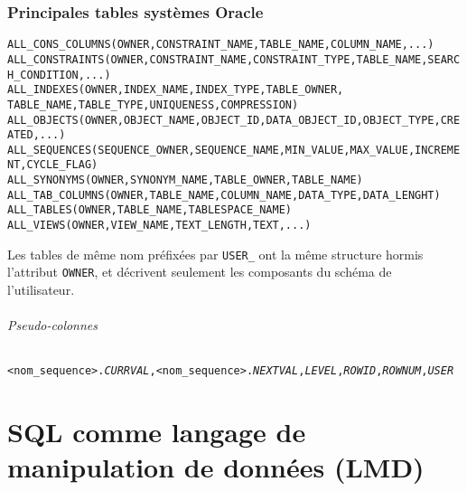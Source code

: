 \documentclass[10pt]{article}
\begin{document}
	\section{Principales tables systèmes Oracle}
		\begin{alltt}
			\begin{tabbing}
				ALL_CONS_COLUMNS \= (OWNER, CONSTRAINT_NAME, TABLE_NAME, COLUMN_NAME,...)\\
				ALL_CONSTRAINTS \> (OWNER, CONSTRAINT_NAME, CONSTRAINT_TYPE, TABLE_NAME, SEARCH_CONDITION,...)\\
				ALL_INDEXES \> (OWNER, INDEX_NAME, INDEX_TYPE, TABLE_OWNER, \\
							\> TABLE_NAME, TABLE_TYPE, UNIQUENESS, COMPRESSION)\\
				ALL_OBJECTS \> (OWNER, OBJECT_NAME, OBJECT_ID, DATA_OBJECT_ID, OBJECT_TYPE, CREATED, ...)\\
				ALL_SEQUENCES \> (SEQUENCE_OWNER, SEQUENCE_NAME, MIN_VALUE, MAX_VALUE, INCREMENT, CYCLE_FLAG)\\
				ALL_SYNONYMS \> (OWNER, SYNONYM_NAME, TABLE_OWNER, TABLE_NAME)\\
				ALL_TAB_COLUMNS \> (OWNER, TABLE_NAME, COLUMN_NAME, DATA_TYPE, DATA_LENGHT)\\
				ALL_TABLES \> (OWNER, TABLE_NAME, TABLESPACE_NAME)\\
				ALL_VIEWS \> (OWNER, VIEW_NAME, TEXT_LENGTH, TEXT,...)
			\end{tabbing}
		\end{alltt}
		
		Les tables de même nom préfixées par \texttt{USER\_} ont la même structure hormis l'attribut \texttt{OWNER}, et décrivent seulement les composants du schéma de l'utilisateur.
		
		\paragraph{Pseudo-colonnes}
			\begin{alltt}
				<nom_sequence>.\emph{CURRVAL}, <nom_sequence>.\emph{NEXTVAL}, \emph{LEVEL}, \emph{ROWID}, \emph{ROWNUM}, \emph{USER}
			\end{alltt}
			
\part{SQL comme langage de manipulation de données (LMD)}
\end{document}
